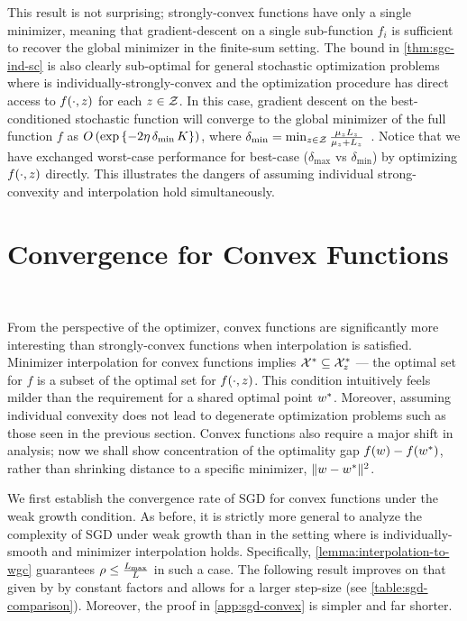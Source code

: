 This result is not surprising; strongly-convex functions have only a single minimizer, meaning that gradient-descent on a single sub-function \( f_i \) is sufficient to recover the global minimizer in the finite-sum setting. 
The bound in \autoref{thm:sgc-ind-sc} is also clearly sub-optimal for general stochastic optimization problems where \oracle{} is individually-strongly-convex and the optimization procedure has direct access to \( f(\cdot, z ) \) for each \( z \in \mathcal{Z} \).
In this case, gradient descent on the best-conditioned stochastic function will converge to the global minimizer of the full function \( f \) as \( O\left(\exp\left\{ - 2 \eta \, \delta_{\text{min}} \, K\right\}\right) \), where \( \delta_{\text{min}} = \min_{z \in \mathcal{Z}} \frac{\mu_z L_z}{\mu_z + L_z} \)~\citep{bubeck2015convex}.
Notice that we have exchanged worst-case performance for best-case (\( \delta_{\text{max}} \) vs \( \delta_{\text{min}} \)) by optimizing \( f(\cdot, z) \) directly. 
This illustrates the dangers of assuming individual strong-convexity and interpolation hold simultaneously.


\section{Convergence for Convex Functions}~\label{sec:sgd-convex}

From the perspective of the optimizer, convex functions are significantly more interesting than strongly-convex functions when interpolation is satisfied. 
Minimizer interpolation for convex functions implies \( \mathcal{X}^* \subseteq \mathcal{X}^*_{z} \) --- the optimal set for \( f \) is a subset of the optimal set for \( f(\cdot, z) \).
This condition intuitively feels milder than the requirement for a shared optimal point \( w^* \). 
Moreover, assuming individual convexity does not lead to degenerate optimization problems such as those seen in the previous section.
Convex functions also require a major shift in analysis; now we shall show concentration of the optimality gap \( f(w) - f(w^*) \), rather than shrinking distance to a specific minimizer, \( \|w - w^*\|^2 \).

We first establish the convergence rate of SGD for convex functions under the weak growth condition. 
As before, it is strictly more general to analyze the complexity of SGD under weak growth than in the setting where \oracle{} is individually-smooth and minimizer interpolation holds. 
Specifically, \autoref{lemma:interpolation-to-wgc} guarantees \( \rho \leq \frac{L_{\text{max}}}{L} \) in such a case. 
The following result improves on that given by \citet{vaswani2019fast} by constant factors and allows for a larger step-size (see \autoref{table:sgd-comparison}).  
Moreover, the proof in \autoref{app:sgd-convex} is simpler and far shorter. 

